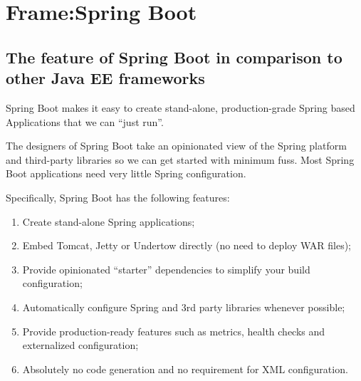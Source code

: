 \documentclass[./report.tex]{subfiles}
\begin{document}
\section{Frame:Spring Boot}
\subsection{The feature of Spring Boot in comparison to other Java EE frameworks}
Spring Boot makes it easy to create stand-alone, production-grade Spring based Applications that we can ``just run''.
\par
The designers of Spring Boot take an opinionated view of the Spring platform and third-party libraries so we can get started with minimum fuss. Most Spring Boot applications need very little Spring configuration.
\par
Specifically, Spring Boot has the following features:
\begin{enumerate}
  \item Create stand-alone Spring applications;
  \item Embed Tomcat, Jetty or Undertow directly (no need to deploy WAR files);
  \item Provide opinionated ``starter'' dependencies to simplify your build configuration;
  \item Automatically configure Spring and 3rd party libraries whenever possible;
  \item Provide production-ready features such as metrics, health checks and externalized configuration;
  \item Absolutely no code generation and no requirement for XML configuration.
\end{enumerate}
\end{document}
